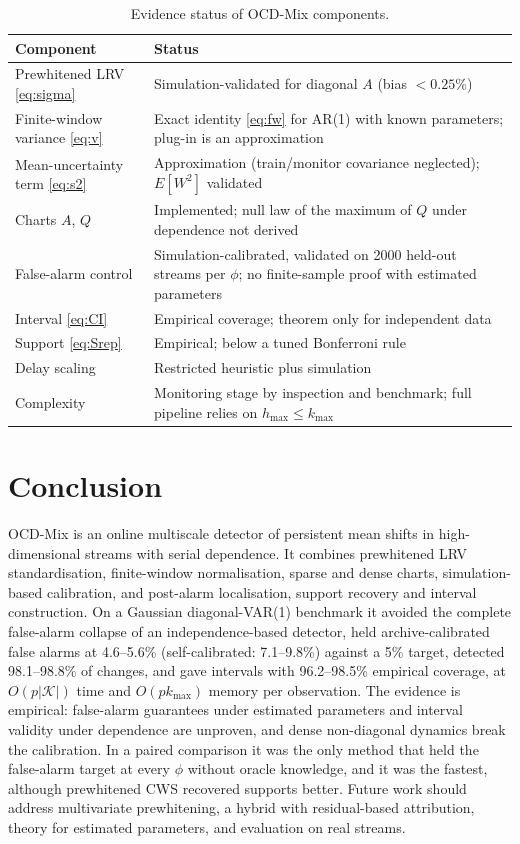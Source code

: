 \documentclass[conference]{IEEEtran}
\begin{document}
\begin{table}[t]
\centering
\caption{Evidence status of OCD-Mix components.}
\label{tab:status}
\small
\begin{tabular}{@{}p{}p{}@{}}
\toprule
Component & Status\\
\midrule
Prewhitened LRV \eqref{eq:sigma} & Simulation-validated for diagonal $A$ (bias $<0.25\%$)\\
Finite-window variance \eqref{eq:v} & Exact identity \eqref{eq:fw} for AR(1) with known parameters; plug-in is an approximation\\
Mean-uncertainty term \eqref{eq:s2} & Approximation (train/monitor covariance neglected); $E[W^2]$ validated\\
Charts $A$, $Q$ & Implemented; null law of the maximum of $Q$ under dependence not derived\\
False-alarm control & Simulation-calibrated, validated on 2000 held-out streams per $\phi$; no finite-sample proof with estimated parameters\\
Interval \eqref{eq:CI} & Empirical coverage; theorem only for independent data\\
Support \eqref{eq:Srep} & Empirical; below a tuned Bonferroni rule\\
Delay scaling & Restricted heuristic plus simulation\\
Complexity & Monitoring stage by inspection and benchmark; full pipeline relies on $h_{\max}\le k_{\max}$\\
\bottomrule
\end{tabular}
\end{table}

\section{Conclusion}
OCD-Mix is an online multiscale detector of persistent mean shifts in high-dimensional streams with serial dependence. It combines prewhitened LRV standardisation, finite-window normalisation, sparse and dense charts, simulation-based calibration, and post-alarm localisation, support recovery and interval construction. On a Gaussian diagonal-VAR(1) benchmark it avoided the complete false-alarm collapse of an independence-based detector, held archive-calibrated false alarms at 4.6--5.6\% (self-calibrated: 7.1--9.8\%) against a 5\% target, detected 98.1--98.8\% of changes, and gave intervals with 96.2--98.5\% empirical coverage, at $O(p|\mathcal{K}|)$ time and $O(pk_{\max})$ memory per observation. The evidence is empirical: false-alarm guarantees under estimated parameters and interval validity under dependence are unproven, and dense non-diagonal dynamics break the calibration. In a paired comparison it was the only method that held the false-alarm target at every $\phi$ without oracle knowledge, and it was the fastest, although prewhitened CWS recovered supports better. Future work should address multivariate prewhitening, a hybrid with residual-based attribution, theory for estimated parameters, and evaluation on real streams.
\end{document}
